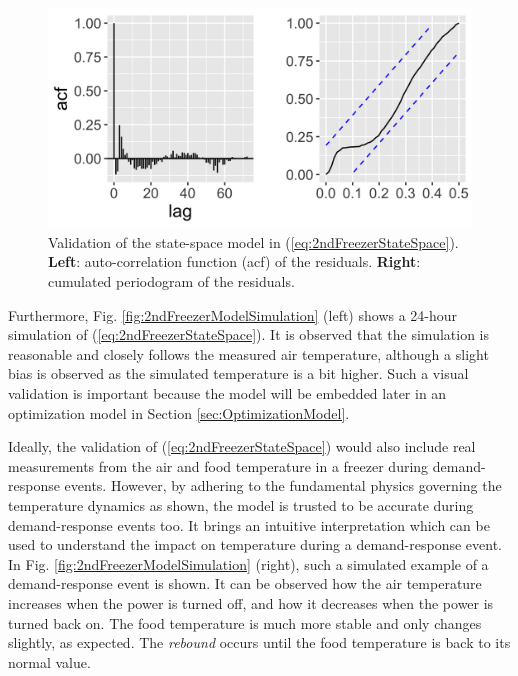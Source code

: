 \documentclass[11pt,a4paper]{article}
\begin{document}
\begin{figure}[!t]
    \centering
    \includegraphics[width=\columnwidth]{figures/2ndFreezerModelValidation.png}
    \caption{ Validation of the state-space model in (\ref{eq:2ndFreezerStateSpace}). \textbf{Left}: auto-correlation function (acf) of the  residuals. \textbf{Right}: cumulated periodogram of the residuals.}
    \label{fig:2ndFreezerModelValidation}
\end{figure}



Furthermore, Fig. \ref{fig:2ndFreezerModelSimulation} (left) shows a 24-hour simulation of  (\ref{eq:2ndFreezerStateSpace}). It is observed that the simulation is  reasonable and closely follows the measured air temperature, although a slight bias is observed as the simulated temperature is a bit higher. Such a visual validation is important because the model will be embedded later in an optimization model in Section \ref{sec:OptimizationModel}.

Ideally, the validation of (\ref{eq:2ndFreezerStateSpace}) would also include real measurements from the air and food temperature in a freezer during demand-response events. However, by adhering to the fundamental physics governing the temperature dynamics as shown, the model is trusted to be accurate during demand-response events too. It brings an intuitive interpretation which can be used to understand the impact on temperature during a demand-response event.
In Fig. \ref{fig:2ndFreezerModelSimulation} (right), such a simulated example of a demand-response event is shown. It can be observed how the air temperature increases when the power is turned off, and how it decreases when the power is turned back on. The food temperature is much more stable and only changes slightly, as expected. The \textit{rebound} occurs until the food temperature is back to its normal value.
\end{document}
